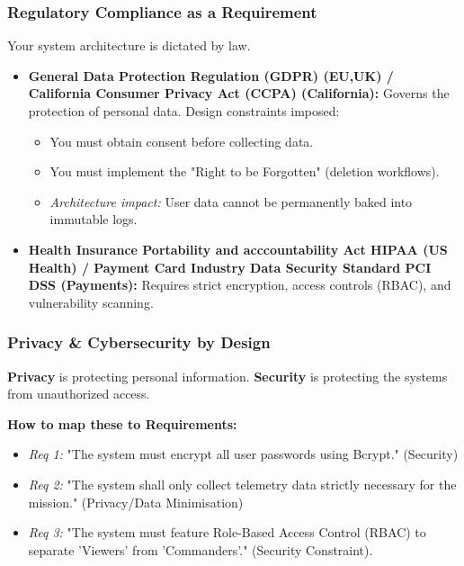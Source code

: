 \documentclass[xcolor=table]{beamer}
\begin{document}
\begin{frame}
    \frametitle{Regulatory Compliance as a Requirement}
    Your system architecture is dictated by law.
    \begin{itemize}
        \item \textbf{General Data Protection Regulation (GDPR) (EU,UK) / California Consumer Privacy Act (CCPA) (California):} Governs the protection of personal data. Design constraints imposed:
        \begin{itemize}
            \item You must obtain consent before collecting data.
            \item You must implement the "Right to be Forgotten" (deletion workflows).
            \item \textit{Architecture impact:} User data cannot be permanently baked into immutable logs.
        \end{itemize}
        \item \textbf{Health Insurance Portability and acccountability Act HIPAA (US Health) / Payment Card Industry Data Security Standard PCI DSS (Payments):} Requires strict encryption, access controls (RBAC), and vulnerability scanning.
    \end{itemize}
\end{frame}

\begin{frame}
    \frametitle{Privacy \& Cybersecurity by Design}
    \textbf{Privacy} is protecting personal information. \textbf{Security} is protecting the systems from unauthorized access.
    
    \vspace{0.3cm}
    \textbf{How to map these to Requirements:}
    \begin{itemize}
        \item \textit{Req 1:} "The system must encrypt all user passwords using Bcrypt." (Security)
        \item \textit{Req 2:} "The system shall only collect telemetry data strictly necessary for the mission." (Privacy/Data Minimisation)
        \item \textit{Req 3:} "The system must feature Role-Based Access Control (RBAC) to separate 'Viewers' from 'Commanders'." (Security Constraint).
    \end{itemize}
\end{frame}
\end{document}
